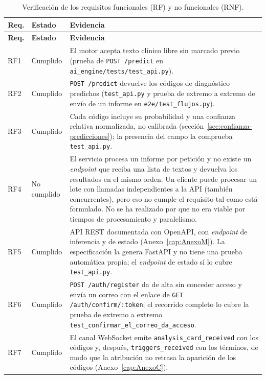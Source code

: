 {\footnotesize
\begin{longtable}{llP{10.4cm}}
\caption{Verificación de los requisitos funcionales (RF) y no funcionales (RNF).}\label{tab:verificacion-req}\\
\hline
\textbf{Req.} & \textbf{Estado} & \textbf{Evidencia} \\
\hline
\endfirsthead
\hline
\textbf{Req.} & \textbf{Estado} & \textbf{Evidencia} \\
\hline
\endhead
RF1 & Cumplido & El motor acepta texto clínico libre sin marcado previo (prueba de \texttt{POST /predict} en \texttt{ai\_engine/\allowbreak{}tests/\allowbreak{}test\_\allowbreak{}api.py}). \\
RF2 & Cumplido & \texttt{POST /predict} devuelve los códigos de diagnóstico predichos (\texttt{test\_\allowbreak{}api.py} y prueba de extremo a extremo de envío de un informe en \texttt{e2e/\allowbreak{}test\_\allowbreak{}flujos.py}). \\
RF3 & Cumplido & Cada código incluye su probabilidad y una confianza relativa normalizada, no calibrada (sección~\ref{sec:confianza-predicciones}); la presencia del campo la comprueba \texttt{test\_\allowbreak{}api.py}. \\
RF4 & No cumplido & El servicio procesa un informe por petición y no existe un \emph{endpoint} que reciba una lista de textos y devuelva los resultados en el mismo orden. Un cliente puede procesar un lote con llamadas independientes a la API (también concurrentes), pero eso no cumple el requisito tal como está formulado. No se ha realizado por que no era viable por tiempos de procesamiento y paralelismo.\\
RF5 & Cumplido & API REST documentada con OpenAPI, con \emph{endpoint} de inferencia y de estado (Anexo~\ref{cap:AnexoM}). La especificación la genera FastAPI y no tiene una prueba automática propia; el \emph{endpoint} de estado sí lo cubre \texttt{test\_\allowbreak{}api.py}. \\
RF6 & Cumplido & \texttt{POST /auth/register} da de alta sin conceder acceso y envía un correo con el enlace de \texttt{GET /auth/confirm/:token}; el recorrido completo lo cubre la prueba de extremo a extremo \texttt{test\_confirmar\_el\_correo\_da\_acceso}. \\
RF7 & Cumplido & El canal WebSocket emite \texttt{analysis\_card\_received} con los códigos y, después, \texttt{triggers\_received} con los términos, de modo que la atribución no retrasa la aparición de los códigos (Anexo~\ref{cap:AnexoC}). \\

\end{longtable}}
